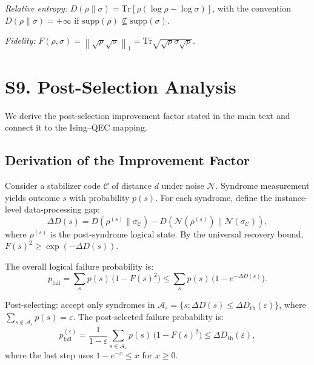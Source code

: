 \documentclass[prl,twocolumn,superscriptaddress,longbibliography]{revtex4-2}
\newcommand{\Tr}{\mathrm{Tr}}
\newcommand{\chan}{\mathcal{N}}
\newcommand{\code}{\mathcal{C}}
\newcommand{\norm}[1]{\left\|#1\right\|}
\begin{document}
\emph{Relative entropy:} $D(\rho\|\sigma) = \Tr[\rho(\log\rho -
\log\sigma)]$, with the convention $D(\rho\|\sigma) = +\infty$ if
$\mathrm{supp}(\rho) \not\subseteq \mathrm{supp}(\sigma)$.

\emph{Fidelity:} $F(\rho,\sigma) = \norm{\sqrt{\rho}\sqrt{\sigma}}_1
= \Tr\sqrt{\sqrt{\rho}\sigma\sqrt{\rho}}$.

\section{S9. Post-Selection Analysis}
\label{sec:postselection}

We derive the post-selection improvement factor stated in the main text
and connect it to the Ising--QEC mapping.

\subsection{Derivation of the Improvement Factor}

Consider a stabilizer code $\code$ of distance $d$ under noise
$\chan$. Syndrome measurement yields outcome $s$ with probability
$p(s)$. For each syndrome, define the instance-level data-processing gap:
\begin{equation}
\Delta D(s) = D(\rho^{(s)}\|\sigma_\code)
  - D(\chan(\rho^{(s)})\|\chan(\sigma_\code)),
\end{equation}
where $\rho^{(s)}$ is the post-syndrome logical state. By the
universal recovery bound, $F(s)^2 \geq \exp(-\Delta D(s))$.

The overall logical failure probability is:
\begin{equation}
p_{\mathrm{fail}} = \sum_s p(s)\, \big(1 - F(s)^2\big)
\leq \sum_s p(s)\, \big(1 - e^{-\Delta D(s)}\big).
\end{equation}

Post-selecting: accept only syndromes in
$\mathcal{A}_\varepsilon = \{s : \Delta D(s) \leq
\Delta D_{\mathrm{th}}(\varepsilon)\}$,
where $\sum_{s \notin \mathcal{A}_\varepsilon} p(s) = \varepsilon$.
The post-selected failure probability is:
\begin{equation}
p_{\mathrm{fail}}^{(\varepsilon)}
= \frac{1}{1-\varepsilon}\sum_{s \in \mathcal{A}_\varepsilon} p(s)\,
  \big(1 - F(s)^2\big)
\leq \Delta D_{\mathrm{th}}(\varepsilon),
\end{equation}
where the last step uses $1 - e^{-x} \leq x$ for $x \geq 0$.
\end{document}
